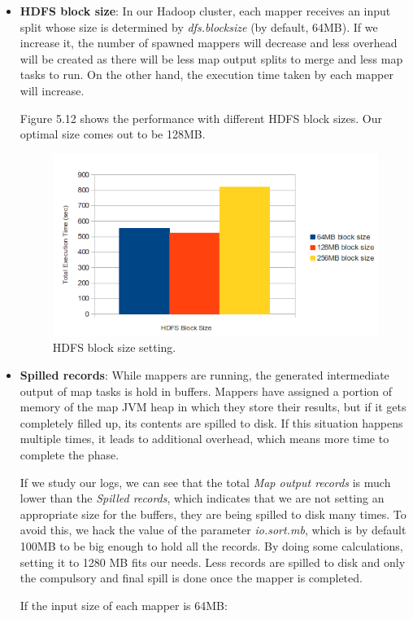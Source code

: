 \begin{itemize}
\item \textbf{HDFS block size}: In our Hadoop cluster, each mapper receives an input split whose size is determined by \textit{dfs.blocksize} (by default, 64MB). If we increase it, the number of spawned mappers will decrease and less overhead will be created as there will be less map output splits to merge and less map tasks to run. On the other hand, the execution time taken by each mapper will increase. 
\par
Figure 5.12 shows the performance with different HDFS block sizes. Our optimal size comes out to be 128MB.

\begin{figure}[htb]
\centering
\includegraphics[width=1\textwidth]{./images/HDFSBlockSize.png}
\caption{HDFS block size setting.} \label{fig:HDFSBlockSize}
\end{figure}




\item \textbf{Spilled records}: While mappers are running, the generated intermediate output of map tasks is hold in buffers. Mappers have assigned a portion of memory of the map JVM heap in which they store their results, but if it gets completely filled up, its contents are spilled to disk. If this situation happens multiple times, it leads to additional overhead, which means more time to complete the phase. 
\par
If we study our logs, we can see that the total \textit{Map output records} is much lower than the \textit{Spilled records}, which indicates that we are not setting an appropriate size for the buffers, they are being spilled to disk many times. To avoid this, we hack the value of the parameter \textit{io.sort.mb}, which is by default 100MB to be big enough to hold all the records. By doing some calculations, setting it to 1280 MB fits our needs. Less records are spilled to disk and only the compulsory and final spill is done once the mapper is completed.
\par
If the input size of each mapper is 64MB:
\bigskip


\end{itemize}
